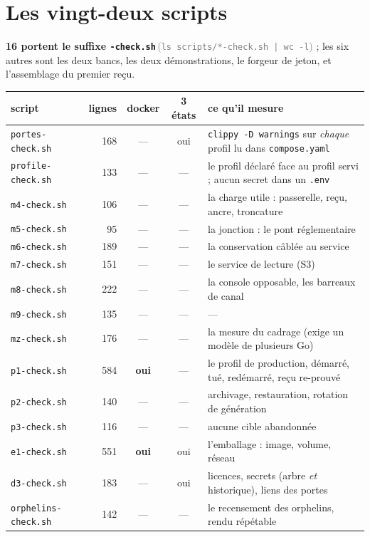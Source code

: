 \documentclass[10pt]{report}
\newcommand{\code}[1]{\texttt{\small #1}}
\newcommand{\mesure}[2]{\textbf{#1}\,\footnotesize\textcolor{grey}{(#2)}\normalsize}
\begin{document}
\section{Les vingt-deux scripts}

\mesure{16 portent le suffixe \code{-check.sh}}{\code{ls scripts/*-check.sh | wc -l}} ; les six autres
sont les deux bancs, les deux démonstrations, le forgeur de jeton, et l'assemblage du premier reçu.

\begin{longtable}{@{}p{4.6cm}r c c p{6.0cm}@{}}
\toprule \textbf{script} & \textbf{lignes} & \textbf{docker} & \textbf{3 états} & \textbf{ce qu'il mesure} \\ \midrule \endhead
\code{portes-check.sh} & 168 & --- & oui & \code{clippy -D warnings} sur \emph{chaque} profil lu dans \code{compose.yaml} \\
\code{profile-check.sh} & 133 & --- & --- & le profil déclaré face au profil servi ; aucun secret dans un \code{.env} \\
\code{m4-check.sh} & 106 & --- & --- & la charge utile : passerelle, reçu, ancre, troncature \\
\code{m5-check.sh} & 95 & --- & --- & la jonction : le pont réglementaire \\
\code{m6-check.sh} & 189 & --- & --- & la conservation câblée au service \\
\code{m7-check.sh} & 151 & --- & --- & le service de lecture (S3) \\
\code{m8-check.sh} & 222 & --- & --- & la console opposable, les barreaux de canal \\
\code{m9-check.sh} & 135 & --- & --- & --- \\
\code{mz-check.sh} & 176 & --- & --- & la mesure du cadrage (exige un modèle de plusieurs Go) \\
\code{p1-check.sh} & 584 & \textbf{oui} & --- & le profil de production, démarré, tué, redémarré, reçu re-prouvé \\
\code{p2-check.sh} & 140 & --- & --- & archivage, restauration, rotation de génération \\
\code{p3-check.sh} & 116 & --- & --- & aucune cible abandonnée \\
\code{e1-check.sh} & 551 & \textbf{oui} & oui & l'emballage : image, volume, réseau \\
\code{d3-check.sh} & 183 & --- & oui & licences, secrets (arbre \emph{et} historique), liens des portes \\
\code{orphelins-check.sh} & 142 & --- & --- & le recensement des orphelins, rendu répétable \\

\end{longtable}
\end{document}
